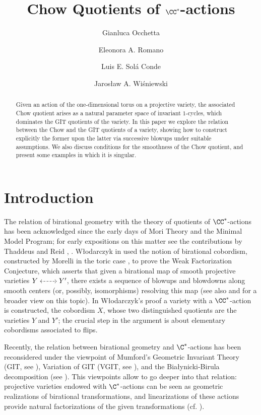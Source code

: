 \documentclass[reqno]{amsproc}
\title[Chow Quotients]{Chow Quotients of $\CC^*$-actions}
\author[Occhetta]{Gianluca Occhetta}
\author[Romano]{Eleonora A. Romano}
\author[Sol\'a Conde]{Luis E. Sol\'a Conde}
\author[Wi\'sniewski]{Jaros\l{}aw A. Wi\'sniewski}
\theoremstyle{definition}
\begin{document}
\begin{abstract}
Given an action of the one-dimensional torus on a projective variety, the associated Chow quotient arises as a natural parameter space of invariant $1$-cycles, which dominates the GIT quotients of the variety.  
In this paper we explore the relation between the Chow and the GIT quotients of a variety, showing how to construct explicitly the former upon the latter via successive blowups under suitable assumptions. We also discuss conditions for the smoothness of the Chow quotient, and present some examples in which it is singular.
\end{abstract}


\maketitle
\tableofcontents
\section{Introduction}\label{sec:intro}

The relation of birational geometry with the theory of quotients of $\CC^*$-actions has been acknowledged since the early days of  Mori Theory and the Minimal Model Program; for early expositions on this matter see the contributions by Thaddeus and Reid \cite{Thaddeus1996}, \cite{ReidFlip}. W{\l}odarczyk in  \cite{Wlodarczyk} used the notion of birational cobordism, constructed by Morelli in the toric case \cite{Morelli}, to prove the Weak Factorization Conjecture,  
which asserts that given a birational map of smooth projective varieties $\begin{tikzcd}[cramped]Y\ar[r,<->, dashed]&Y'\end{tikzcd}$, there exists a sequence of blowups and blowdowns along smooth centers (or, possibly, isomorphisms) resolving this map  (see also \cite{AKMW} and \cite{Wlodarczyk2009} for a broader view on this topic). In W{\l}odarczyk's proof a variety with a $\CC^*$-action is constructed, the cobordism $X$, whose two distinguished quotients are the varieties $Y$ and $Y'$; the crucial step in the argument is about elementary cobordisms associated to flips. 

Recently, the relation between birational geometry and $\C^*$-actions has been reconsidered under the viewpoint of Mumford's Geometric Invariant Theory (GIT, see \cite{MFK}), Variation of GIT (VGIT, see \cite{DolgachevHu}), and the Bia{\l}ynicki-Birula decomposition (see \cite{BB,BBS}). This viewpoints allow to go deeper into that relation: projective varieties endowed with $\C^*$-actions can be seen as geometric realizations of birational transformations, and linearizations of these actions provide natural factorizations of the given transformations (cf. \cite{WORS4, WORS5, WORS3,WORS1, BRUS}). 
\end{document}
